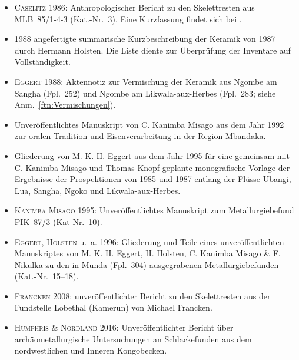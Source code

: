 {\footnotesize
{}
\begin{itemize}[leftmargin=9mm]
\setlength\itemindent{-9mm}
\item[] \textsc{Caselitz} 1986: Anthropologischer Bericht zu den Skelettresten aus MLB~85/1-4-3 (Kat.-Nr.~3). Eine Kurzfassung findet sich bei \textcite[144]{Eggert.1987c}.
\item[] 1988 angefertigte summarische Kurzbeschreibung der Keramik von 1987 durch Hermann Holsten. Die Liste diente zur Überprüfung der Inventare auf Vollständigkeit.
\item[] \textsc{Eggert} 1988: Aktennotiz zur Vermischung der Keramik aus Ngombe am \mbox{Sangha} (Fpl.~252) und Ngombe am \mbox{Likwala}-\mbox{aux}-\mbox{Herbes} (Fpl.~283; siehe Anm.~\ref{ftn:Vermischungen}).
\item[] Unveröffentlichtes Manuskript von C. Kanimba Misago aus dem Jahr 1992 zur oralen Tradition und Eisenverarbeitung in der Region Mbandaka.
\item[] Gliederung von M. K. H. Eggert aus dem Jahr 1995 für eine gemeinsam mit C. Kanimba Misago und Thomas Knopf geplante monografische Vorlage der Ergebnisse der Prospektionen von 1985 und 1987 entlang der Flüsse \mbox{Ubangi}, Lua, \mbox{Sangha}, \mbox{Ngoko} und \mbox{Likwala}-\mbox{aux}-\mbox{Herbes}.
\item[] \textsc{Kanimba Misago} 1995: Unveröffentlichtes Manuskript zum Metallurgiebefund PIK~87/3 (Kat-Nr.~10).
\item[] \textsc{Eggert, Holsten} u.~a. 1996: Gliederung und Teile eines unveröffentlichten Manuskriptes von M. K. H. Eggert, H. Holsten, C. Kanimba Misago \& F. Nikulka zu den in Munda (Fpl.~304) ausgegrabenen Metallurgiebefunden (Kat.-Nr.~15--18).
\item[] \textsc{Francken 2008}: unveröffentlichter Bericht zu den Skelettresten aus der Fundstelle Lobethal (Kamerun) von Michael Francken.
\item[] \textsc{Humphris \& Nordland} 2016: Unveröffentlichter Bericht über archäometallurgische Untersuchungen an Schlackefunden aus dem nordwestlichen und Inneren Kongobecken.
\end{itemize}}

